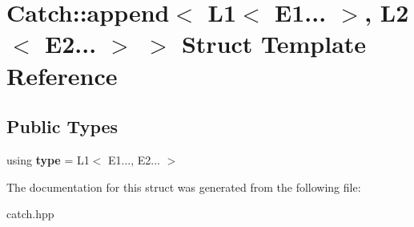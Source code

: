 \hypertarget{structCatch_1_1append_3_01L1_3_01E1_8_8_8_01_4_00_01L2_3_01E2_8_8_8_01_4_01_4}{}\section{Catch\+::append$<$ L1$<$ E1... $>$, L2$<$ E2... $>$ $>$ Struct Template Reference}
\label{structCatch_1_1append_3_01L1_3_01E1_8_8_8_01_4_00_01L2_3_01E2_8_8_8_01_4_01_4}
\subsection*{Public Types}
\begin{DoxyCompactItemize}
\item 
\mbox{\label{structCatch_1_1append_3_01L1_3_01E1_8_8_8_01_4_00_01L2_3_01E2_8_8_8_01_4_01_4_a1cfbd4f828534748c95543b4eac962cd}} 
using {\bfseries type} = L1$<$ E1..., E2... $>$
\end{DoxyCompactItemize}


The documentation for this struct was generated from the following file\+:\begin{DoxyCompactItemize}
\item 
catch.\+hpp\end{DoxyCompactItemize}
